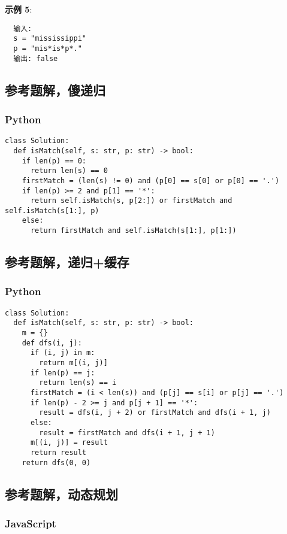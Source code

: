 \textbf{示例 5}:

\begin{verbatim}
  输入:
  s = "mississippi"
  p = "mis*is*p*."
  输出: false
\end{verbatim}

\subsection{参考题解，傻递归}

\subsubsection{Python}

\begin{verbatim}
class Solution:
  def isMatch(self, s: str, p: str) -> bool:
    if len(p) == 0:
      return len(s) == 0
    firstMatch = (len(s) != 0) and (p[0] == s[0] or p[0] == '.')
    if len(p) >= 2 and p[1] == '*':
      return self.isMatch(s, p[2:]) or firstMatch and self.isMatch(s[1:], p)
    else:
      return firstMatch and self.isMatch(s[1:], p[1:])
\end{verbatim}

\subsection{参考题解，递归+缓存}

\subsubsection{Python}

\begin{verbatim}
class Solution:
  def isMatch(self, s: str, p: str) -> bool:
    m = {}
    def dfs(i, j):
      if (i, j) in m:
        return m[(i, j)]
      if len(p) == j:
        return len(s) == i
      firstMatch = (i < len(s)) and (p[j] == s[i] or p[j] == '.')
      if len(p) - 2 >= j and p[j + 1] == '*':
        result = dfs(i, j + 2) or firstMatch and dfs(i + 1, j)
      else:
        result = firstMatch and dfs(i + 1, j + 1)
      m[(i, j)] = result
      return result
    return dfs(0, 0)
\end{verbatim}

\subsection{参考题解，动态规划}

\subsubsection{JavaScript}

